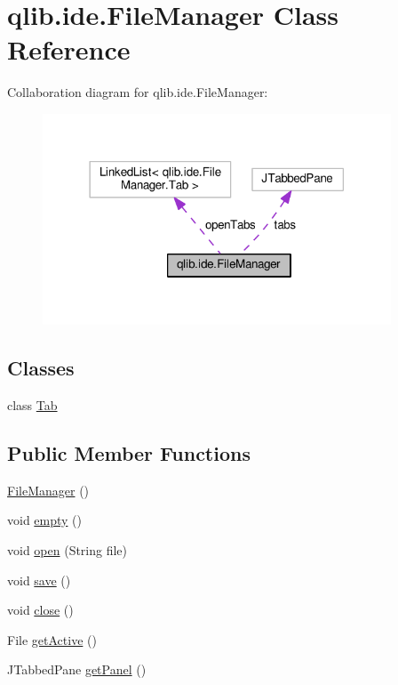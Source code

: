 \hypertarget{classqlib_1_1ide_1_1FileManager}{}\section{qlib.\+ide.\+File\+Manager Class Reference}
\label{classqlib_1_1ide_1_1FileManager}


Collaboration diagram for qlib.\+ide.\+File\+Manager\+:\nopagebreak
\begin{figure}[H]
\begin{center}
\leavevmode
\includegraphics[width=294pt]{classqlib_1_1ide_1_1FileManager__coll__graph}
\end{center}
\end{figure}
\subsection*{Classes}
\begin{DoxyCompactItemize}
\item 
class \hyperlink{classqlib_1_1ide_1_1FileManager_1_1Tab}{Tab}
\end{DoxyCompactItemize}
\subsection*{Public Member Functions}
\begin{DoxyCompactItemize}
\item 
\hyperlink{classqlib_1_1ide_1_1FileManager_ad6a89c4b0f958a34dd7450ab8826f647}{File\+Manager} ()
\item 
void \hyperlink{classqlib_1_1ide_1_1FileManager_a9b6923afb970442de71a07405abc6751}{empty} ()
\item 
void \hyperlink{classqlib_1_1ide_1_1FileManager_a1a740e6ad8726d1caad504a4b7a53859}{open} (String file)
\item 
void \hyperlink{classqlib_1_1ide_1_1FileManager_a043ddff761f62666fa4f6959b7e116c3}{save} ()
\item 
void \hyperlink{classqlib_1_1ide_1_1FileManager_acefb35297452dccb1f7a2cbebd08b0fc}{close} ()
\item 
File \hyperlink{classqlib_1_1ide_1_1FileManager_afa5d713317aa1248f7c102dd086e53b8}{get\+Active} ()
\item 
J\+Tabbed\+Pane \hyperlink{classqlib_1_1ide_1_1FileManager_a986392eebf1b4d6df69bf3eca688d926}{get\+Panel} ()
\end{DoxyCompactItemize}

